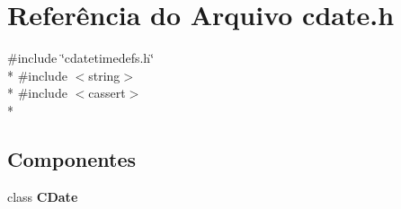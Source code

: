 \section{Referência do Arquivo cdate.\+h}
\label{cdate_8h}
{\ttfamily \#include \char`\"{}cdatetimedefs.\+h\char`\"{}}\\*
{\ttfamily \#include $<$string$>$}\\*
{\ttfamily \#include $<$cassert$>$}\\*
\subsection*{Componentes}
\begin{DoxyCompactItemize}
\item 
class {\bf C\+Date}
\end{DoxyCompactItemize}
